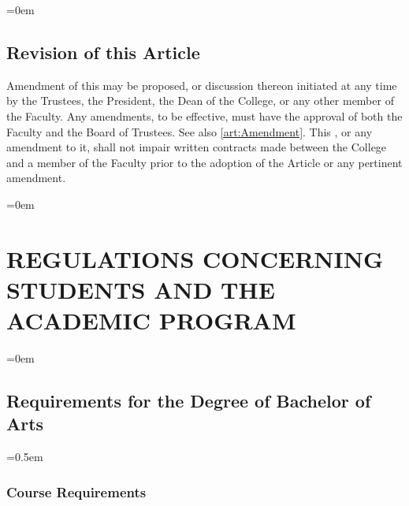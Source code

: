 \documentclass{manual}
\let\stdsection\section %
\renewcommand\section{\newpage\stdsection}
\let\oldsection\section
\renewcommand\section{\leftskip=0em\oldsection}
\let\oldsubsection\subsection
\renewcommand\subsection{\leftskip=0em\oldsubsection}
\let\oldsubsubsection\subsubsection
\renewcommand\subsubsection{\leftskip=0.5em\oldsubsubsection}
\begin{document}
\subsection{Revision of this Article}\label{sec:Revision}
Amendment of this  may be proposed, or discussion thereon initiated at any time by the Trustees, the President, the Dean of the College, or any other member of the Faculty. Any amendments, to be effective, must have the approval of both the Faculty and the Board of Trustees. See also \cref{art:Amendment}. This , or any amendment to it, shall not impair written contracts made between the College and a member of the Faculty prior to the adoption of the Article or any pertinent amendment.


















































\section{REGULATIONS CONCERNING STUDENTS AND THE ACADEMIC PROGRAM}\label{art:RegulationsConcerningStudentStatus}


\subsection{Requirements for the Degree of Bachelor of Arts}


\subsubsection{Course Requirements}
\end{document}
